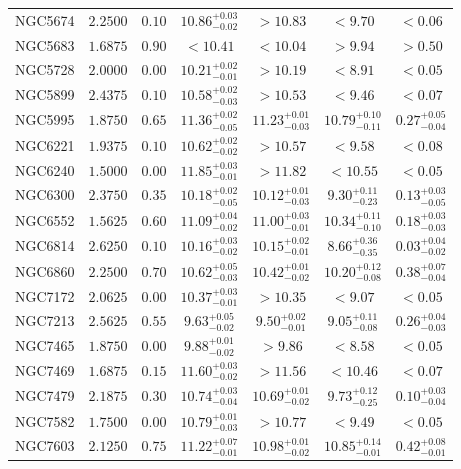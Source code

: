 \documentclass[onecolumn]{mn2e}
\begin{document}
{\begin{center}
\begin{longtable}{lcccccc}
NGC5674 & $2.2500$ & $0.10$ & $10.86_{-0.02}^{+0.03}$ & $>10.83$ & $<9.70$ &$<0.06$ \\
NGC5683 & $1.6875$ & $0.90$ & $<10.41$ & $<10.04$ & $>9.94$ &$>0.50$ \\
NGC5728 & $2.0000$ & $0.00$ & $10.21_{-0.01}^{+0.02}$ & $>10.19$ & $<8.91$ &$<0.05$ \\
NGC5899 & $2.4375$ & $0.10$ & $10.58_{-0.03}^{+0.02}$ & $>10.53$ & $<9.46$ &$<0.07$ \\
NGC5995 & $1.8750$ & $0.65$ & $11.36_{-0.05}^{+0.02}$ & $11.23_{-0.03}^{+0.01}$ & $10.79_{-0.11}^{+0.10}$ &$0.27_{-0.04}^{+0.05}$ \\
NGC6221 & $1.9375$ & $0.10$ & $10.62_{-0.02}^{+0.02}$ & $>10.57$ & $<9.58$ &$<0.08$ \\
NGC6240 & $1.5000$ & $0.00$ & $11.85_{-0.01}^{+0.03}$ & $>11.82$ & $<10.55$ &$<0.05$ \\
NGC6300 & $2.3750$ & $0.35$ & $10.18_{-0.05}^{+0.02}$ & $10.12_{-0.03}^{+0.01}$ & $9.30_{-0.23}^{+0.11}$ &$0.13_{-0.05}^{+0.03}$ \\
NGC6552 & $1.5625$ & $0.60$ & $11.09_{-0.02}^{+0.04}$ & $11.00_{-0.01}^{+0.03}$ & $10.34_{-0.10}^{+0.11}$ &$0.18_{-0.03}^{+0.03}$ \\
NGC6814 & $2.6250$ & $0.10$ & $10.16_{-0.02}^{+0.03}$ & $10.15_{-0.01}^{+0.02}$ & $8.66_{-0.35}^{+0.36}$ &$0.03_{-0.02}^{+0.04}$ \\
NGC6860 & $2.2500$ & $0.70$ & $10.62_{-0.03}^{+0.05}$ & $10.42_{-0.02}^{+0.01}$ & $10.20_{-0.08}^{+0.12}$ &$0.38_{-0.04}^{+0.07}$ \\
NGC7172 & $2.0625$ & $0.00$ & $10.37_{-0.01}^{+0.03}$ & $>10.35$ & $<9.07$ &$<0.05$ \\
NGC7213 & $2.5625$ & $0.55$ & $9.63_{-0.02}^{+0.05}$ & $9.50_{-0.01}^{+0.02}$ & $9.05_{-0.08}^{+0.11}$ &$0.26_{-0.03}^{+0.04}$ \\
NGC7465 & $1.8750$ & $0.00$ & $9.88_{-0.02}^{+0.01}$ & $>9.86$ & $<8.58$ &$<0.05$ \\
NGC7469 & $1.6875$ & $0.15$ & $11.60_{-0.02}^{+0.03}$ & $>11.56$ & $<10.46$ &$<0.07$ \\
NGC7479 & $2.1875$ & $0.30$ & $10.74_{-0.04}^{+0.03}$ & $10.69_{-0.02}^{+0.01}$ & $9.73_{-0.25}^{+0.12}$ &$0.10_{-0.04}^{+0.03}$ \\
NGC7582 & $1.7500$ & $0.00$ & $10.79_{-0.03}^{+0.01}$ & $>10.77$ & $<9.49$ &$<0.05$ \\
NGC7603 & $2.1250$ & $0.75$ & $11.22_{-0.01}^{+0.07}$ & $10.98_{-0.02}^{+0.01}$ & $10.85_{-0.01}^{+0.14}$ &$0.42_{-0.01}^{+0.08}$ \\

\end{longtable}
\end{center}}
\end{document}
